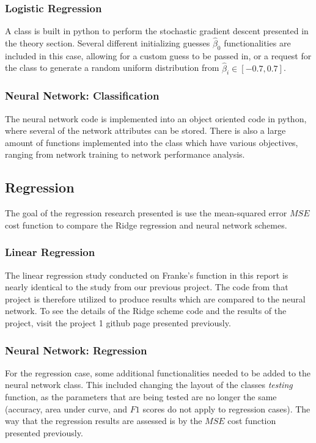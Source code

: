         \subsubsection{Logistic Regression}
            A class is built in python to perform the stochastic gradient descent presented in the theory section. Several different initializing guesses $\hat{\beta}_0$ functionalities are included in this case, allowing for a custom guess to be passed in, or a request for the class to generate a random uniform distribution from $\hat{\beta}_i \in [-0.7, 0.7]$.
                
        \subsubsection{Neural Network: Classification}
            The neural network code is implemented into an object oriented code in python, where several of the network attributes can be stored. There is also a large amount of functions implemented into the class which have various objectives, ranging from network training to network performance analysis. 
        
            
    \subsection{Regression}
        The goal of the regression research presented is use the mean-squared error $MSE$ cost function to compare the Ridge regression and neural network schemes. 
        \subsubsection{Linear Regression}
            The linear regression study conducted on Franke's function in this report is nearly identical to the study from our previous project. The code from that project is therefore utilized to produce results which are compared to the neural network. To see the details of the Ridge scheme code and the results of the project, visit the project 1 github page presented previously.
        \subsubsection{Neural Network: Regression}
            For the regression case, some additional functionalities needed to be added to the neural network class. This included changing the layout of the classes \textit{testing} function, as the parameters that are being tested are no longer the same (accuracy, area under curve, and $F1$ scores do not apply to regression cases). The way that the regression results are assessed is by the $MSE$ cost function presented previously. 